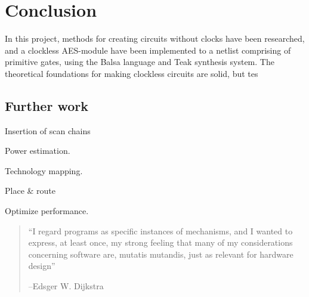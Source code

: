 \section{Conclusion}

In this project, methods for creating circuits without clocks have
been researched, and a clockless AES-module have been implemented to a
netlist comprising of primitive gates, using the Balsa language and
Teak synthesis system. The theoretical foundations for making
clockless circuits are solid, but tes

\subsection{Further work}

Insertion of scan chains

Power estimation.

Technology mapping.

Place \& route

Optimize performance.

\begin{quotation}
  ``I regard programs as specific instances of mechanisms, and I wanted
  to express, at least once, my strong feeling that many of my
  considerations concerning software are, mutatis mutandis, just as
  relevant for hardware design''

  --Edsger W. Dijkstra
\end{quotation}

